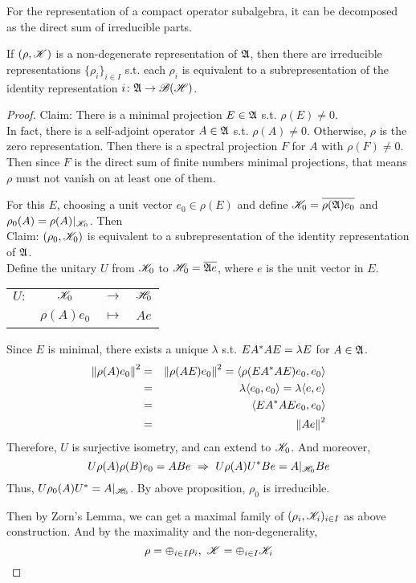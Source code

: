 For the representation of a compact operator subalgebra, it can be decomposed as the direct sum of irreducible parts.
\begin{thm}
	If $(\rho, \mathscr{K})$ is a non-degenerate representation of $\mathfrak{A}$, then there are irreducible representations $\{\rho_i\}_{i \in I}$ s.t. each $\rho_i$ is equivalent to a subrepresentation of the identity representation $i \colon \mathfrak{A} \rightarrow \mathscr{B(H)}$.
\end{thm}
\begin{proof}
	Claim: There is a minimal projection $E \in \mathfrak{A}$ s.t. $\rho(E) \neq 0$. \\
	In fact, there is a self-adjoint operator $A \in \mathfrak{A}$ s.t. $\rho(A) \neq 0$. Otherwise, $\rho$ is the zero representation. Then there is a spectral projection $F$ for $A$ with $\rho(F) \neq 0$. Then since $F$ is the direct sum of finite numbers minimal projections, that means $\rho$ must not vanish on at least one of them.
	\item For this $E$, choosing a unit vector $e_0 \in \rho(E)$ and define $\mathscr{K}_0 = \overline{\rho(\mathfrak{A})e_0}$ and $\rho_0(A) = \rho(A)|_{\mathscr{K}_0}$. Then \\
	Claim: $(\rho_0,\mathscr{K}_0)$ is equivalent to a subrepresentation of the identity representation of $\mathfrak{A}$.\\
	Define the unitary $U$ from $\mathscr{K}_0$ to $\mathscr{H}_0 = \overline{\mathfrak{A} e}$, where $e$ is the unit vector in $E$. 
	\begin{center}
		\begin{tabular}{l c c l}
			$U \colon$ & $\mathscr{K}_0$ & $\longrightarrow$ & $\mathscr{H}_0$ \\
			~ & $\rho(A)e_0$ & $\longmapsto$ & $Ae$
		\end{tabular}
	\end{center}
	Since $E$ is minimal, there exists a unique $\lambda$ s.t. $E A^{*}A E = \lambda E$ for $A \in \mathfrak{A}$.
	\begin{eqnarray*}
		\left\lVert\rho(A)e_0\right\lVert^2 &=& \left\lVert\rho(AE)e_0\right\lVert^2 = \langle \rho(E A^{*}AE)e_0,e_0 \rangle\\
		&=& \lambda \langle e_0,e_0 \rangle = \lambda \langle e,e \rangle \\
		&=& \langle E A^{*}AE e_0,e_0 \rangle \\
		&=& \left\lVert Ae\right\lVert^2
	\end{eqnarray*}
	Therefore, $U$ is surjective isometry, and can extend to $\mathscr{K}_0$. And moreover,
	\begin{equation*}
		U\rho(A)\rho(B)e_0 = A Be ~\Rightarrow~ U\rho(A) U^{*} Be = A|_{\mathscr{H}_0} Be
	\end{equation*}
	Thus, $U\rho_0(A)U^{*} = A|_{\mathscr{H}_0}$. By above proposition, $\rho_0$ is irreducible.
	\item Then by Zorn's Lemma, we can get a maximal family of $(\rho_i, \mathscr{K}_i)_{i \in I}$ as above construction. And by the maximality and the non-degenerality, 
	\begin{equation*}
		\rho = \oplus_{i \in I} \rho_i,~ \mathscr{K} = \oplus_{i \in I} \mathscr{K}_i \qedhere
	\end{equation*}
\end{proof}
